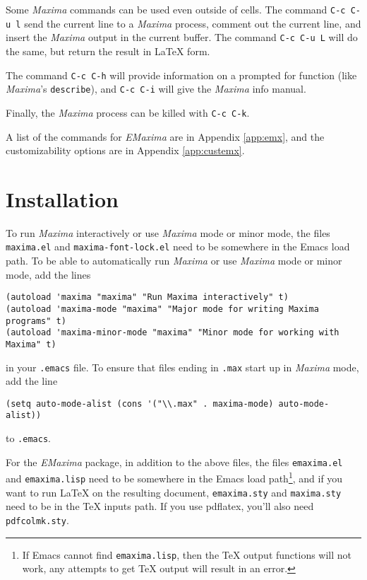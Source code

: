 \documentclass{article}
\newcommand{\emx}{\textsl{\sffamily EMaxima}}
\newcommand{\mx}{\textsl{\sffamily Maxima}}
\newcommand{\hyph}{-\hspace{0pt}}
\begin{document}
\noindent
Some \mx{} commands can be used even outside of cells.  The command 
\texttt{C-c C-u l} send the current line to a
\mx{} process, comment out the current line, and insert the \mx{}
output in the current buffer.  The command 
\texttt{C-c C-u L} will do the same, but
return the result in \LaTeX{} form.

The command \texttt{C-c C-h} will provide
information on a prompted for function (like \mx's \texttt{describe}), 
and  \texttt{C-c C-i} will give the \mx{} info manual.

Finally, the \mx{} process can be killed with \texttt{C-c C-k}.

A list of the commands for \emx{} are in Appendix \ref{app:emx}, and
the customizability options are in Appendix \ref{app:custemx}.

\newpage
\appendix

\section{Installation}

To run \mx{} interactively or use \mx{} mode or minor mode, the files
\texttt{maxima.el} and \texttt{maxima\hyph{}font\hyph{}lock.el} need to be
somewhere in the Emacs load path.  To be able to automatically run
\mx{} or use \mx{} mode or minor mode, add the lines\\
\begin{verbatim}
(autoload 'maxima "maxima" "Run Maxima interactively" t)
(autoload 'maxima-mode "maxima" "Major mode for writing Maxima programs" t)
(autoload 'maxima-minor-mode "maxima" "Minor mode for working with Maxima" t)

\end{verbatim}
\noindent
in your \texttt{.emacs} file.  
To ensure that files ending in \texttt{.max} start up in \mx{} mode,
add the line
\begin{verbatim}
(setq auto-mode-alist (cons '("\\.max" . maxima-mode) auto-mode-alist))
\end{verbatim}
to \texttt{.emacs}.

For the \emx{} package, in addition to the above files, the files
\texttt{emaxima.el} and \texttt{emaxima.lisp} need to be somewhere in
the Emacs load path\footnote{If Emacs cannot find
  \texttt{emaxima.lisp}, then the \TeX{} output functions will not
  work, any attempts to get \TeX{} output will result in an error.},
  and if you want to run \LaTeX{} on the resulting document,
\texttt{emaxima.sty} and \texttt{maxima.sty} need to be in the \TeX{}
inputs path.  If you use pdflatex, you'll also need \texttt{pdfcolmk.sty}.
\end{document}
